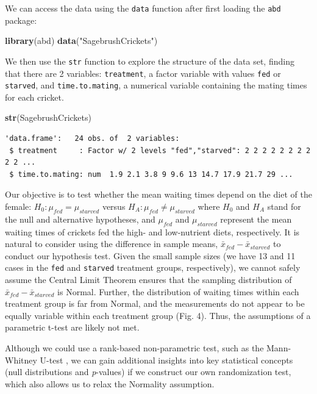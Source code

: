 \documentclass[fleqn,10pt]{wlpeerj} %
\newenvironment{Shaded}{\begin{snugshade}}{\end{snugshade}}
\newcommand{\KeywordTok}[1]{\textcolor[rgb]{0.13,0.29,0.53}{\textbf{#1}}}
\newcommand{\NormalTok}[1]{#1}
\newcommand{\StringTok}[1]{\textcolor[rgb]{0.31,0.60,0.02}{#1}}
\begin{document}
We can access the data using the \texttt{data} function after first loading the \texttt{abd} package:

\begin{Shaded}
\begin{Highlighting}[]
\KeywordTok{library}\NormalTok{(abd)}
\KeywordTok{data}\NormalTok{(}\StringTok{"SagebrushCrickets"}\NormalTok{)}
\end{Highlighting}
\end{Shaded}

We then use the \texttt{str} function to explore the structure of the data set, finding that there are 2 variables: \texttt{treatment}, a factor variable with values \texttt{fed} or \texttt{starved}, and \texttt{time.to.mating}, a numerical variable containing the mating times for each cricket.

\begin{Shaded}
\begin{Highlighting}[]
\KeywordTok{str}\NormalTok{(SagebrushCrickets)}
\end{Highlighting}
\end{Shaded}

\begin{verbatim}
'data.frame':   24 obs. of  2 variables:
 $ treatment     : Factor w/ 2 levels "fed","starved": 2 2 2 2 2 2 2 2 2 2 ...
 $ time.to.mating: num  1.9 2.1 3.8 9 9.6 13 14.7 17.9 21.7 29 ...
\end{verbatim}

Our objective is to test whether the mean waiting times depend on the diet of the female: \(H_0: \mu_{fed} = \mu_{starved}\) versus \(H_A: \mu_{fed} \ne \mu_{starved}\) where \(H_0\) and \(H_A\) stand for the null and alternative hypotheses, and \(\mu_{fed}\) and \(\mu_{starved}\) represent the mean waiting times of crickets fed the high- and low-nutrient diets, respectively. It is natural to consider using the difference in sample means, \(\bar{x}_{fed}-\bar{x}_{starved}\) to conduct our hypothesis test.
Given the small sample sizes (we have 13 and 11 cases in the \texttt{fed} and \texttt{starved} treatment groups, respectively), we cannot safely assume the Central Limit Theorem ensures that the sampling distribution of \(\bar{x}_{fed}-\bar{x}_{starved}\) is Normal. Further, the distribution of waiting times within each treatment group is far from Normal, and the measurements do not appear to be equally variable within each treatment group (Fig. 4). Thus, the assumptions of a parametric t-test are likely not met.

Although we could use a rank-based non-parametric test, such as the
Mann-Whitney U-test \citep{whitlock2009analysis}, we can gain additional insights into key statistical concepts (null distributions and \emph{p}-values) if we construct our own randomization test, which also allows us to relax the Normality assumption.
\end{document}
